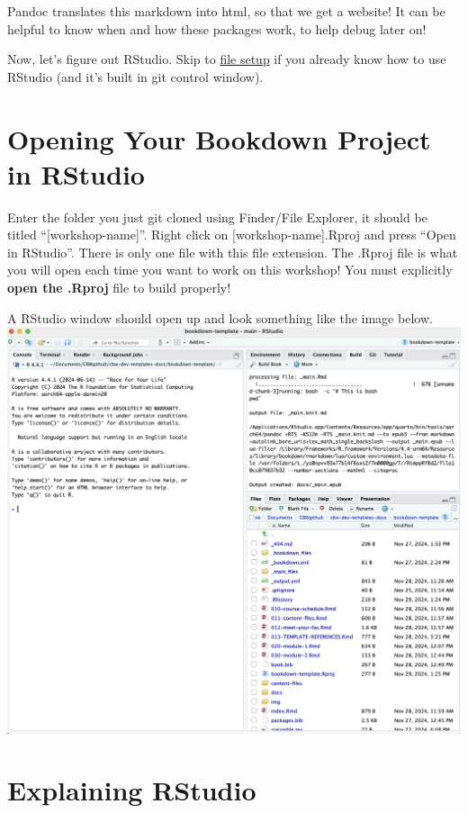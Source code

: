 \documentclass[
]{book}
\theoremstyle{definition}
\theoremstyle{definition}
\theoremstyle{definition}
\theoremstyle{definition}
\theoremstyle{remark}
\begin{document}
Pandoc translates this markdown into html, so that we get a website! It can be helpful to know when and how these packages work, to help debug later on!

Now, let's figure out RStudio. Skip to \hyperref[file-setup]{file setup} if you already know how to use RStudio (and it's built in git control window).

\section{Opening Your Bookdown Project in RStudio}\label{opening-your-bookdown-project-in-rstudio}

Enter the folder you just git cloned using Finder/File Explorer, it should be titled ``{[}workshop-name{]}''. Right click on {[}workshop-name{]}.Rproj and press ``Open in RStudio''. There is only one file with this file extension. The .Rproj file is what you will open each time you want to work on this workshop! You must explicitly \textbf{open the .Rproj} file to build properly!

A RStudio window should open up and look something like the image below.
\includegraphics{img/files-and-build/newly-opened-RStudio.png}\\

\section{Explaining RStudio}\label{explaining-rstudio}
\end{document}
